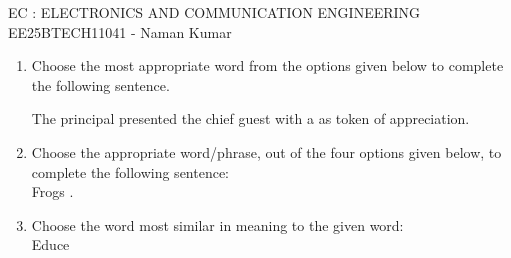 \documentclass[a4paper, 11pt]{article}
\begin{document}
\begin{center}
    \huge{EC : ELECTRONICS AND COMMUNICATION ENGINEERING}\\
    \large{EE25BTECH11041 - Naman Kumar}
\end{center}

\begin{enumerate}
\section*{General Aptitude }
    \item Choose the most appropriate word from the options given below to complete the following sentence.
    
    The principal presented the chief guest with a \underline{\hspace{2cm}} as token of appreciation.
    \begin{enumerate}
    \end{enumerate}
    
    \hfill{}

    \item Choose the appropriate word/phrase, out of the four options given below, to complete the following sentence:\\Frogs \underline{\hspace{2cm}}.
    \begin{enumerate}
    \end{enumerate}
    
    \hfill{}

    \item Choose the word most similar in meaning to the given word:\\Educe
    \begin{enumerate}
    \end{enumerate}
    

\end{enumerate}
\end{document}
